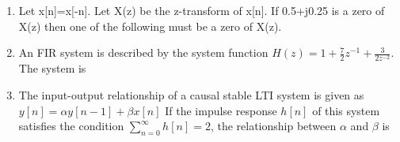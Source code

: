 \documentclass[journal,12pt,twocolumn]{IEEEtran}
\begin{document}
\begin{enumerate}
\begin{enumerate}[(A)]

\end{enumerate}




\item Let x[n]=x[-n]. Let X(z) be the z-transform of x[n]. If 0.5+j0.25 is a zero of X(z) then one of the following must be a zero of X(z).
\begin{enumerate}[(A)]

\end{enumerate}


\item An FIR system is described by the system function $H(z)=1+\frac{7}{2}z^{-1}+\frac{3}{2z^{-2}}$. The system is 
\begin{enumerate}[(A)]

\end{enumerate}




\item The input-output relationship of a causal stable LTI system is given as $y[n]=\alpha y[n-1]+\beta x[n]$ \newline If the impulse response $h[n]$ of this system satisfies the condition $\sum_{n=0}^{\infty}h[n]=2$, the relationship between $\alpha$ and $\beta$ is
\begin{enumerate}[(A)]


\end{enumerate}
\end{enumerate}
\end{document}
